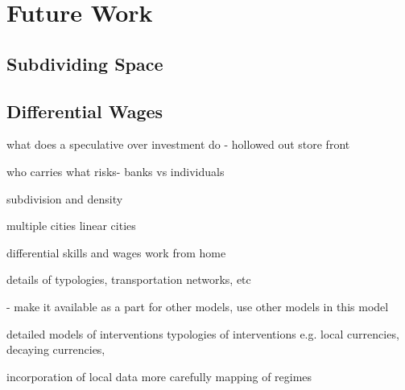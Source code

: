 \chapter[Future Work]{Future Work}
\label{AppendixA}
\section{Subdividing Space}

\section{Differential Wages}



what does a speculative over investment do - hollowed out store front

who carries what risks- banks vs individuals

subdivision and density

multiple cities
linear cities


differential skills and wages
work from home

details of typologies, transportation networks, etc


- make it available as a part for other models, use other models in this model

detailed models of interventions typologies of interventions e.g. local currencies, decaying currencies, 



incorporation of local data more carefully
mapping of regimes
